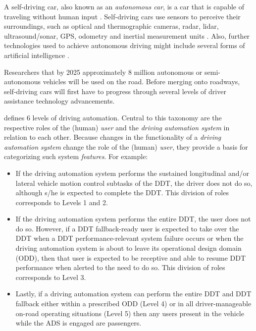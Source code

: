 A self-driving car, also known as an \textit{autonomous car}, is a car that is capable of traveling without human input \cite{Xie}.
Self-driving cars use sensors to perceive their surroundings, such as optical and thermographic cameras, radar, lidar, ultrasound/sonar, GPS, odometry and inertial measurement units \cite{Xie2}.
Also, further technologies used to achieve autonomous driving might include several forms of artificial intelligence \cite{atakishiyev2023explainable}.

Researchers  that by 2025 approximately 8 million autonomous or semi-autonomous vehicles will be used on the road.
Before merging onto roadways, self-driving cars will first have to progress through several levels of driver assistance technology advancements.


 defines 6 levels of driving automation. 
Central to this taxonomy are the respective roles of the (human) \textit{user} and the \textit{driving automation system} in relation to each other. 
Because changes in the functionality of a \textit{driving automation system} change the role of the (human) \textit{user}, they provide a basis for categorizing such system \textit{features}. 
For example:

\begin{itemize}

  \item If the driving automation system performs the sustained longitudinal and/or lateral vehicle motion control subtasks of
  the DDT, the driver does not do so, although s/he is expected to complete the DDT. This division of roles corresponds
  to Levels 1 and 2.
  \item If the driving automation system performs the entire DDT, the user does not do so. However, if a DDT fallback-ready
  user is expected to take over the DDT when a DDT performance-relevant system failure occurs or when the driving
  automation system is about to leave its operational design domain (ODD), then that user is expected to be receptive
  and able to resume DDT performance when alerted to the need to do so. This division of roles corresponds to Level 3.
  \item Lastly, if a driving automation system can perform the entire DDT and DDT fallback either within a prescribed ODD
  (Level 4) or in all driver-manageable on-road operating situations (Level 5) then any users present in the vehicle while
  the ADS is engaged are passengers. 
  
\end{itemize}

